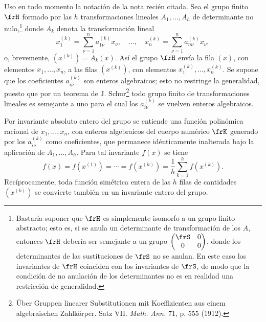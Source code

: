 \documentclass[11pt]{article}
\begin{document}
Uso en todo momento la notación de la nota recién citada. Sea el grupo finito \(\frH\) formado por las \(h\) transformaciones lineales \(A_1,\ldots,A_h\) de determinante no nulo,\footnote{Bastaría suponer que \(\frH\) es simplemente isomorfo a un grupo finito abstracto; esto es, si se anula un determinante de transformación de los \(A\), entonces \(\frH\) debería ser semejante a un grupo \(\begin{pmatrix}\frS&0\\0&0\end{pmatrix}\), donde los determinantes de las sustituciones de \(\frS\) no se anulan. En este caso los invariantes de \(\frH\) coinciden con los invariantes de \(\frS\), de modo que la condición de no anulación de los determinantes no es en realidad una restricción de generalidad.} donde \(A_k\) denota la transformación lineal
\[
        x_1^{(k)}=\sum_{\nu=1}^{n}a_{1\nu}^{(k)}x_\nu,
        \quad\ldots,\quad
        x_n^{(k)}=\sum_{\nu=1}^{n}a_{n\nu}^{(k)}x_\nu,
\]
o, brevemente, \((x^{(k)})=A_k(x)\). Así el grupo \(\frH\) envía la fila \((x)\), con elementos \(x_1,\ldots,x_n\), a las filas \((x^{(k)})\), con elementos \(x_1^{(k)},\ldots,x_n^{(k)}\). Se supone que los coeficientes \(a_{i\nu}^{(k)}\) son enteros algebraicos; esto no restringe la generalidad, puesto que por un teorema de J. Schur\footnote{Über Gruppen linearer Substitutionen mit Koeffizienten aus einem algebraischen Zahlkörper. Satz VII. \emph{Math. Ann.} 71, p. 555 (1912).} todo grupo finito de transformaciones lineales es semejante a uno para el cual los \(a_{i\nu}^{(k)}\) se vuelven enteros algebraicos.

Por invariante absoluto entero del grupo se entiende una función polinómica racional de \(x_1,\ldots,x_n\), con enteros algebraicos del cuerpo numérico \(\frK\) generado por los \(a_{i\nu}^{(k)}\) como coeficientes, que permanece idénticamente inalterada bajo la aplicación de \(A_1,\ldots,A_h\). Para tal invariante \(f(x)\) se tiene
\begin{equation}
        f(x)=f(x^{(1)})=\cdots=f(x^{(h)})
        =\frac1h\sum_{k=1}^{h}f(x^{(k)}).
\end{equation}
Recíprocamente, toda función simétrica entera de las \(h\) filas de cantidades \((x^{(k)})\) se convierte también en un invariante entero del grupo.
\end{document}
